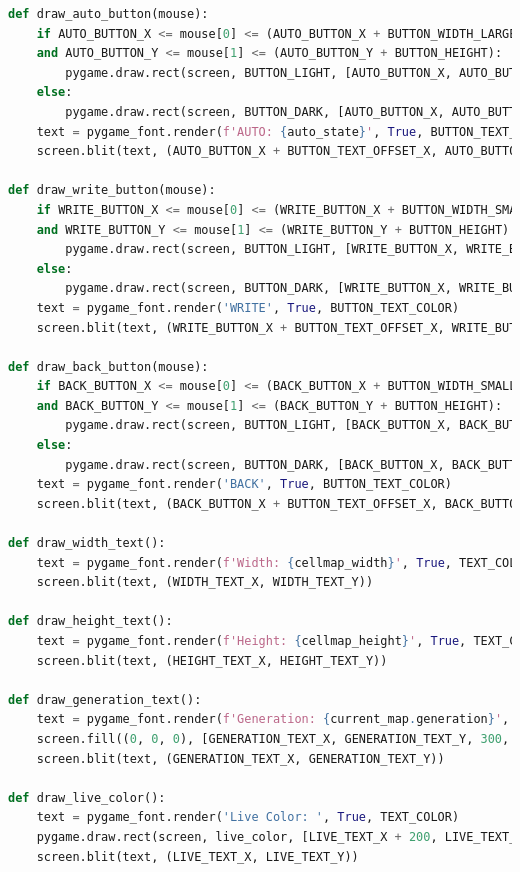 \documentclass[12pt]{report}
\begin{document}
\begin{lstlisting}[language=Python, caption=game\_of\_life.py]
def draw_auto_button(mouse):
    if AUTO_BUTTON_X <= mouse[0] <= (AUTO_BUTTON_X + BUTTON_WIDTH_LARGE) \
    and AUTO_BUTTON_Y <= mouse[1] <= (AUTO_BUTTON_Y + BUTTON_HEIGHT):
        pygame.draw.rect(screen, BUTTON_LIGHT, [AUTO_BUTTON_X, AUTO_BUTTON_Y, BUTTON_WIDTH_LARGE, BUTTON_HEIGHT])
    else:
        pygame.draw.rect(screen, BUTTON_DARK, [AUTO_BUTTON_X, AUTO_BUTTON_Y, BUTTON_WIDTH_LARGE, BUTTON_HEIGHT])
    text = pygame_font.render(f'AUTO: {auto_state}', True, BUTTON_TEXT_COLOR)
    screen.blit(text, (AUTO_BUTTON_X + BUTTON_TEXT_OFFSET_X, AUTO_BUTTON_Y + BUTTON_TEXT_OFFSET_Y))

def draw_write_button(mouse):
    if WRITE_BUTTON_X <= mouse[0] <= (WRITE_BUTTON_X + BUTTON_WIDTH_SMALL) \
    and WRITE_BUTTON_Y <= mouse[1] <= (WRITE_BUTTON_Y + BUTTON_HEIGHT):
        pygame.draw.rect(screen, BUTTON_LIGHT, [WRITE_BUTTON_X, WRITE_BUTTON_Y, BUTTON_WIDTH_SMALL, BUTTON_HEIGHT])
    else:
        pygame.draw.rect(screen, BUTTON_DARK, [WRITE_BUTTON_X, WRITE_BUTTON_Y, BUTTON_WIDTH_SMALL, BUTTON_HEIGHT])
    text = pygame_font.render('WRITE', True, BUTTON_TEXT_COLOR)
    screen.blit(text, (WRITE_BUTTON_X + BUTTON_TEXT_OFFSET_X, WRITE_BUTTON_Y + BUTTON_TEXT_OFFSET_Y))

def draw_back_button(mouse):
    if BACK_BUTTON_X <= mouse[0] <= (BACK_BUTTON_X + BUTTON_WIDTH_SMALL) \
    and BACK_BUTTON_Y <= mouse[1] <= (BACK_BUTTON_Y + BUTTON_HEIGHT):
        pygame.draw.rect(screen, BUTTON_LIGHT, [BACK_BUTTON_X, BACK_BUTTON_Y, BUTTON_WIDTH_SMALL, BUTTON_HEIGHT])
    else:
        pygame.draw.rect(screen, BUTTON_DARK, [BACK_BUTTON_X, BACK_BUTTON_Y, BUTTON_WIDTH_SMALL, BUTTON_HEIGHT])
    text = pygame_font.render('BACK', True, BUTTON_TEXT_COLOR)
    screen.blit(text, (BACK_BUTTON_X + BUTTON_TEXT_OFFSET_X, BACK_BUTTON_Y + BUTTON_TEXT_OFFSET_Y))

def draw_width_text():
    text = pygame_font.render(f'Width: {cellmap_width}', True, TEXT_COLOR)
    screen.blit(text, (WIDTH_TEXT_X, WIDTH_TEXT_Y))

def draw_height_text():
    text = pygame_font.render(f'Height: {cellmap_height}', True, TEXT_COLOR)
    screen.blit(text, (HEIGHT_TEXT_X, HEIGHT_TEXT_Y))

def draw_generation_text():
    text = pygame_font.render(f'Generation: {current_map.generation}', True, TEXT_COLOR)
    screen.fill((0, 0, 0), [GENERATION_TEXT_X, GENERATION_TEXT_Y, 300, 300])
    screen.blit(text, (GENERATION_TEXT_X, GENERATION_TEXT_Y))

def draw_live_color():
    text = pygame_font.render('Live Color: ', True, TEXT_COLOR)
    pygame.draw.rect(screen, live_color, [LIVE_TEXT_X + 200, LIVE_TEXT_Y, 20, 20])
    screen.blit(text, (LIVE_TEXT_X, LIVE_TEXT_Y))


\end{lstlisting}
\end{document}

